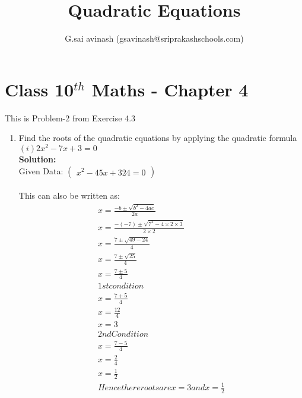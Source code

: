 \documentclass[12pt]{article}
\title{Quadratic Equations}
\author{G.sai avinash (gsavinash@sriprakashschools.com)}
\newcommand{\myvec}[1]{\ensuremath{\begin{pmatrix}#1\end{pmatrix}}}
\newcommand{\solution}{\noindent \textbf{Solution: }}
\begin{document}
\maketitle
\section*{Class 10$^{th}$ Maths - Chapter 4}
This is Problem-2 from Exercise 4.3
\begin{enumerate}
\item{Find the roots of the quadratic equations by applying the quadratic formula }\\
${(i)2{x^2} - 7x + 3 = 0}$\\
\solution \\
Given Data:
\myvec{x^2-45x+324=0}\\
\\This can also be written as:
\begin{align}
{x=\frac{-b\pm\sqrt{b^2-4ac}}{2a}}\\
{x=\frac{-(-7)\pm\sqrt{7^2-4 \times 2\times3}}{2 \times 2}}\\
{x=\frac{7\pm\sqrt{49 - 24}}{4}}\\
{x=\frac{7\pm\sqrt{25}}{4}}\\
{x=\frac{7\pm{5}}{4}}\\
1st condition\\
{x=\frac{7+5}{4}}\\
{x=\frac{12}{4}}\\
x=3\\
2nd Condition\\
{x=\frac{7-5}{4}}\\
{x=\frac{2}{4}}\\
{x=\frac{1}{2}}\\
 Hence there roots are x=3 and {x=\frac{1}{2}}
\end{align}
	

\end{enumerate}
\end{document}
